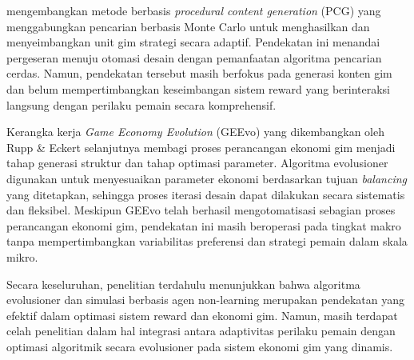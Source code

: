 \cite{sorochan2022generatingrealtimestrategygame} mengembangkan metode berbasis \textit{procedural content generation} (PCG) yang menggabungkan pencarian berbasis Monte Carlo untuk menghasilkan dan menyeimbangkan unit gim strategi secara adaptif. Pendekatan ini menandai pergeseran menuju otomasi desain dengan pemanfaatan algoritma pencarian cerdas. Namun, pendekatan tersebut masih berfokus pada generasi konten gim dan belum mempertimbangkan keseimbangan sistem reward yang berinteraksi langsung dengan perilaku pemain secara komprehensif.


Kerangka kerja \textit{Game Economy Evolution} (GEEvo) yang dikembangkan oleh Rupp \& Eckert \cite{Rupp_2024} selanjutnya membagi proses perancangan ekonomi gim menjadi tahap generasi struktur dan tahap optimasi parameter. Algoritma evolusioner digunakan untuk menyesuaikan parameter ekonomi berdasarkan tujuan \textit{balancing} yang ditetapkan, sehingga proses iterasi desain dapat dilakukan secara sistematis dan fleksibel. Meskipun GEEvo telah berhasil mengotomatisasi sebagian proses perancangan ekonomi gim, pendekatan ini masih beroperasi pada tingkat makro tanpa mempertimbangkan variabilitas preferensi dan strategi pemain dalam skala mikro.

Secara keseluruhan, penelitian terdahulu menunjukkan bahwa algoritma evolusioner dan simulasi berbasis agen non-learning merupakan pendekatan yang efektif dalam optimasi sistem reward dan ekonomi gim. Namun, masih terdapat celah penelitian dalam hal integrasi antara adaptivitas perilaku pemain dengan optimasi algoritmik secara evolusioner pada sistem ekonomi gim yang dinamis.



